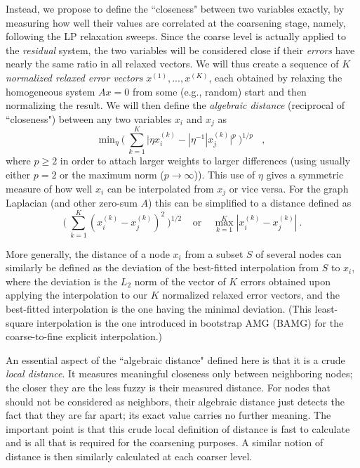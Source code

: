 \documentclass[final]{siamltex}
\begin{document}
Instead, we propose to define the ``closeness" between two
variables exactly, by measuring how well their values are
correlated at the coarsening stage, namely, following the LP
relaxation sweeps. Since the coarse level is actually applied to
the {\it residual} system, the two variables will be considered
close if their {\it errors} have nearly the same ratio in all
relaxed vectors. We will thus create a sequence of $K$ {\it
normalized relaxed error vectors} $x^{(1)}, ... ,x^{(K)}$, each
obtained by relaxing the homogeneous system $Ax = 0$ from some
(e.g., random) start and then normalizing the result. We will then
define the {\it algebraic distance} (reciprocal of ``closeness")
between any two variables $x_i$ and $x_j$ as
\begin{equation}\label{intro3}
{\text {min}}_{\eta} ~\bigg(~\sum_{k=1}^K |\eta x_i^{(k)} - {|\eta^{-1}|
x_j^{(k)}|^p~\bigg)^{1/p}}~~~~,
\end{equation}
where $p \geq 2$ in order to attach larger weights to larger differences (using usually either $p=2$ or the maximum norm ($p \rightarrow \infty$)). This use of $\eta$ gives a symmetric measure of how well
$x_i$ can be interpolated from $x_j$ or vice versa.
For the graph Laplacian (and other zero-sum $A$) this can
be simplified to a distance defined as
\begin{equation}\label{intro4}
\bigg(~\sum_{k=1}^K (x_i^{(k)}-x_j^{(k)})^2~\bigg)^{1/2} ~~~~~{\text {or}}
~~~~~\max_{k=1}^K |x^{(k)}_i - x^{(k)}_j|~.
\end{equation}

More generally, the distance of a node $x_i$ from a subset $S$ of
several nodes can similarly be defined as the deviation of the
best-fitted interpolation from $S$ to $x_i$, where the deviation
is the $L_2$ norm of the vector of $K$ errors obtained upon
applying the interpolation to our $K$ normalized relaxed error
vectors, and the best-fitted interpolation is the one having the
minimal deviation. (This least-square interpolation is the one
introduced in bootstrap AMG (BAMG) \cite{amg} for the coarse-to-fine explicit
interpolation.)

An essential aspect of the ``algebraic distance" defined here is
that it is a crude {\it local distance}. It measures
meaningful closeness only between neighboring nodes; the closer
they are the less fuzzy is their measured distance. For nodes that
should not be considered as neighbors, their algebraic distance
just detects the fact that they are far apart; its exact value carries
no further meaning. The important point is that this crude local
definition of distance is fast to calculate and is all
that is required for the coarsening purposes. A similar notion of
distance is then similarly calculated at each coarser level.
\end{document}
